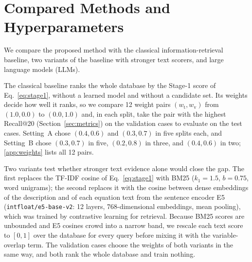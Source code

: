 \section{Compared Methods and Hyperparameters}
\label{sec:compared}

We compare the proposed method with the classical information-retrieval baseline, two variants of
the baseline with stronger text scorers, and large language models (LLMs).

The classical baseline ranks the whole database by the Stage-1 score of Eq.~\eqref{eq:stage1},
without a learned model and without a candidate set. Its weights decide how well it ranks, so we
compare 12 weight pairs $(w_{\mathrm{t}}, w_{\mathrm{v}})$ from $(1.0, 0.0)$ to $(0.0, 1.0)$ and,
in each split, take the pair with the highest Recall@20 (Section~\ref{sec:metrics}) on the
validation cases to evaluate on the test cases. Setting~A chose $(0.4, 0.6)$ and $(0.3, 0.7)$ in
five splits each, and Setting~B chose $(0.3, 0.7)$ in five, $(0.2, 0.8)$ in three, and $(0.4, 0.6)$
in two; \ref{app:weights} lists all 12 pairs.

Two variants test whether stronger text evidence alone would close the gap. The first replaces the
TF-IDF cosine of Eq.~\eqref{eq:stage1} with BM25\cite{BM25} ($k_1 = 1.5$, $b = 0.75$, word
unigrams); the second replaces it with the cosine between dense embeddings of the description and
of each equation text from the sentence encoder E5\cite{E5} (\texttt{intfloat/e5-base-v2}: 12
layers, 768-dimensional embeddings, mean pooling), which was trained by contrastive learning for
retrieval. Because BM25 scores are unbounded and E5 cosines crowd into a narrow band, we rescale
each text score to $[0, 1]$ over the database for every query before mixing it with the
variable-overlap term. The validation cases choose the weights of both variants in the same way,
and both rank the whole database and train nothing.

